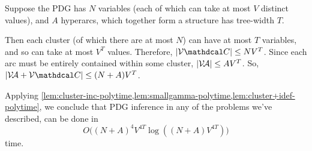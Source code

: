 \documentclass[twoside]{article}
\begin{document}
\begin{lproof}\label{proof:main}
    Suppose the PDG has $N$ variables 
    (each of which can take at most $V$ distinct values), 
    and $A$ hyperarcs, which together form a structure has tree-width $T$. 
    
    Then each cluster (of which there are at most $N$) 
    can have at most $T$ variables, and so can take at most $V^T$ values.
    Therefore, $|\V \mathdcal C| \le N V^T$.
    Since each arc must be entirely contained within some cluster, 
    $|\mathcal V\!\mathcal A| \le A V^T$. 
    So, $|\V\!\Ar + \V \mathdcal C| \le (N+A) V^T$. 
    
    Applying \cref{lem:cluster-inc-polytime,lem:smallgamma-polytime,lem:cluster+idef-polytime}, we conclude that PDG inference in any of the problems we've described, can be done in
    \[
        O\Big(  (N+A)^4 V^{4T} \log ((N+A) V^{4T}) \Big)
    \]
    time.
\end{lproof}

\subsection{}
\end{document}
